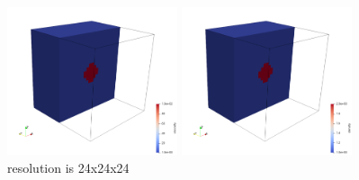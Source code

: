 \begin{center}
\includegraphics[width=5cm]{python_codes/fieldstone_stokes_sphere_3D/visc}
\includegraphics[width=5cm]{python_codes/fieldstone_stokes_sphere_3D/dens}\\
{\small resolution is 24x24x24}
\end{center}


